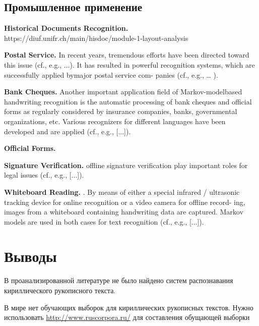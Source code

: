 \subsection*{Промышленное применение}

\textbf{Historical Documents Recognition.} \cite{romero2012multimodal, frinken2013handwriting, edwards2007easily} https://diuf.unifr.ch/main/hisdoc/module-1-layout-analysis

\textbf{Postal Service.} In recent years, tremendous efforts have been directed toward this issue (cf., e.g., ...). It has resulted in powerful recognition systems, which are successfully applied bymajor postal service com- panies (cf., e.g., … ). \cite{plotz2009markov}

\textbf{Bank Cheques.} Another important application field of Markov-modelbased handwriting recognition is the automatic processing of bank cheques and official forms as regularly considered by insurance companies, banks, governmental organizations, etc. Various recognizers for different languages have been developed and are applied (cf., e.g., [...]). \cite{plotz2009markov}

\textbf{Official Forms.}

\textbf{Signature Verification.} offline signature verification play important roles for legal issues (cf., e.g., [...]). \cite{plotz2009markov}

\textbf{Whiteboard Reading.} \cite{wienecke2005toward}. By means of either a special infrared / ultrasonic tracking device for online recognition or a video camera for offline record- ing, images from a whiteboard containing handwriting data are captured. Markov models are used in both cases for text recognition (cf., e.g., [...]). \cite{plotz2009markov}

\section*{Выводы}

В проанализированной литературе не было найдено систем распознавания кириллического рукописного текста.

В мире нет обучающих выборок для кириллических рукописных текстов. Нужно использовать \url{http://www.ruscorpora.ru/} для составления обущающей выборки

